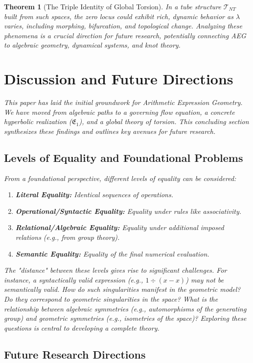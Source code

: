 \documentclass[12pt]{article}
\newtheorem{theorem}{Theorem}[section]
\begin{document}
\begin{theorem}[The Triple Identity of Global Torsion]
In a tube structure \( \mathcal{T}_{NT} \) built from such spaces, the zero locus could exhibit rich, dynamic behavior as \( \lambda \) varies, including morphing, bifurcation, and topological change. Analyzing these phenomena is a crucial direction for future research, potentially connecting AEG to algebraic geometry, dynamical systems, and knot theory.

\section{Discussion and Future Directions}\label{sec:discussion_future}

This paper has laid the initial groundwork for Arithmetic Expression Geometry. We have moved from algebraic paths to a governing flow equation, a concrete hyperbolic realization (\( \mathfrak{E}_1 \)), and a global theory of torsion. This concluding section synthesizes these findings and outlines key avenues for future research.

\subsection{Levels of Equality and Foundational Problems}

From a foundational perspective, different levels of equality can be considered:
\begin{enumerate}
    \item \textbf{Literal Equality:} Identical sequences of operations.
    \item \textbf{Operational/Syntactic Equality:} Equality under rules like associativity.
    \item \textbf{Relational/Algebraic Equality:} Equality under additional imposed relations (e.g., from group theory).
    \item \textbf{Semantic Equality:} Equality of the final numerical evaluation.
\end{enumerate}
The "distance" between these levels gives rise to significant challenges. For instance, a syntactically valid expression (e.g., \( 1 \div (x-x) \)) may not be semantically valid. How do such singularities manifest in the geometric model? Do they correspond to geometric singularities in the space? What is the relationship between algebraic symmetries (e.g., automorphisms of the generating group) and geometric symmetries (e.g., isometries of the space)? Exploring these questions is central to developing a complete theory.

\subsection{Future Research Directions}


\end{theorem}
\end{document}

